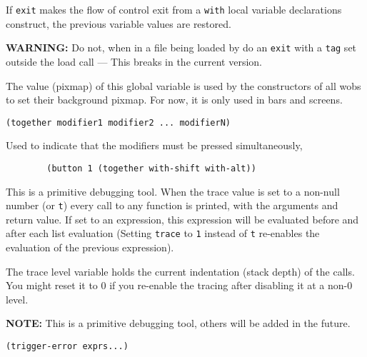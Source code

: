 If \verb"exit" makes the flow of control exit from a
\verb"with" local variable declarations construct, the previous variable
values are restored.

{\bf WARNING:} Do not, when in a file being loaded by  do an
\verb"exit" with a \verb"tag" set outside the load call --- This breaks
{\GWM} in the current version.

        

The value (pixmap) of this global variable is used by the constructors of all
wobs to set their background pixmap. For now, it is only used in bars and
screens.

        
{\usagefont\begin{verbatim}
(together modifier1 modifier2 ... modifierN)
\end{verbatim}}\usageupspace

Used to indicate that the modifiers must be pressed simultaneously, 

{\exemplefont\begin{verbatim}
        (button 1 (together with-shift with-alt))
\end{verbatim}}

        

This is a primitive debugging tool. When the trace value is set to a non-null
number (or \verb"t") every call to any {\WOOL} function is printed,
with the arguments and return value.  If set to an expression, this expression
will be evaluated before and after each list evaluation (Setting
\verb"trace" to \verb"1" instead of \verb"t" re-enables the evaluation of
the previous expression).

The trace level variable holds the
current indentation (stack depth) of the calls.  You might reset it to 0 if
you re-enable the tracing after disabling it at a non-0 level.

{\bf NOTE:} This is a primitive debugging tool, others will be added
in the future.

        
{\usagefont\begin{verbatim}
(trigger-error exprs...)
\end{verbatim}}\usageupspace

